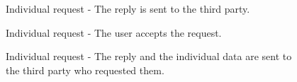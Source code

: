 \begin{figure}[ht]
    \caption{Individual request - The reply is sent to the third party.}
    \label{RV5}
\end{figure}

\begin{figure}[ht]
    \caption{Individual request - The user accepts the request.}
    \label{RV6}
\end{figure}

\begin{figure}[ht]
    \caption{Individual request - The reply and the individual data are sent to the third party who requested them.}
    \label{RV7}
\end{figure}

